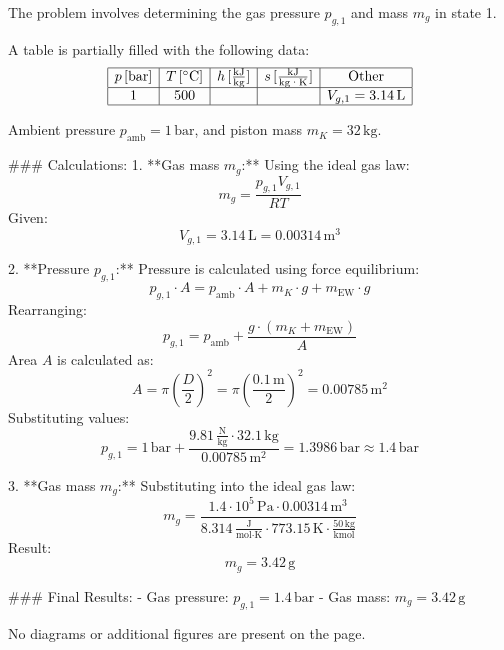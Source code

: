 The problem involves determining the gas pressure \( p_{g,1} \) and mass \( m_g \) in state 1.  

A table is partially filled with the following data:  
\[
\begin{array}{|c|c|c|c|c|}
\hline
p \, [\text{bar}] & T \, [^\circ\text{C}] & h \, [\frac{\text{kJ}}{\text{kg}}] & s \, [\frac{\text{kJ}}{\text{kg·K}}] & \text{Other} \\
\hline
1 & 500 & & & V_{g,1} = 3.14 \, \text{L} \\
\hline
\end{array}
\]

Ambient pressure \( p_{\text{amb}} = 1 \, \text{bar} \), and piston mass \( m_K = 32 \, \text{kg} \).  

### Calculations:  
1. **Gas mass \( m_g \):**  
   Using the ideal gas law:  
   \[
   m_g = \frac{p_{g,1} V_{g,1}}{R T}
   \]  
   Given:  
   \[
   V_{g,1} = 3.14 \, \text{L} = 0.00314 \, \text{m}^3
   \]

2. **Pressure \( p_{g,1} \):**  
   Pressure is calculated using force equilibrium:  
   \[
   p_{g,1} \cdot A = p_{\text{amb}} \cdot A + m_K \cdot g + m_{\text{EW}} \cdot g
   \]  
   Rearranging:  
   \[
   p_{g,1} = p_{\text{amb}} + \frac{g \cdot (m_K + m_{\text{EW}})}{A}
   \]  
   Area \( A \) is calculated as:  
   \[
   A = \pi \left( \frac{D}{2} \right)^2 = \pi \left( \frac{0.1 \, \text{m}}{2} \right)^2 = 0.00785 \, \text{m}^2
   \]  
   Substituting values:  
   \[
   p_{g,1} = 1 \, \text{bar} + \frac{9.81 \, \frac{\text{N}}{\text{kg}} \cdot 32.1 \, \text{kg}}{0.00785 \, \text{m}^2} = 1.3986 \, \text{bar} \approx 1.4 \, \text{bar}
   \]

3. **Gas mass \( m_g \):**  
   Substituting into the ideal gas law:  
   \[
   m_g = \frac{1.4 \cdot 10^5 \, \text{Pa} \cdot 0.00314 \, \text{m}^3}{8.314 \, \frac{\text{J}}{\text{mol·K}} \cdot 773.15 \, \text{K} \cdot \frac{50 \, \text{kg}}{\text{kmol}}}
   \]  
   Result:  
   \[
   m_g = 3.42 \, \text{g}
   \]  

### Final Results:  
- Gas pressure: \( p_{g,1} = 1.4 \, \text{bar} \)  
- Gas mass: \( m_g = 3.42 \, \text{g} \)  

No diagrams or additional figures are present on the page.
